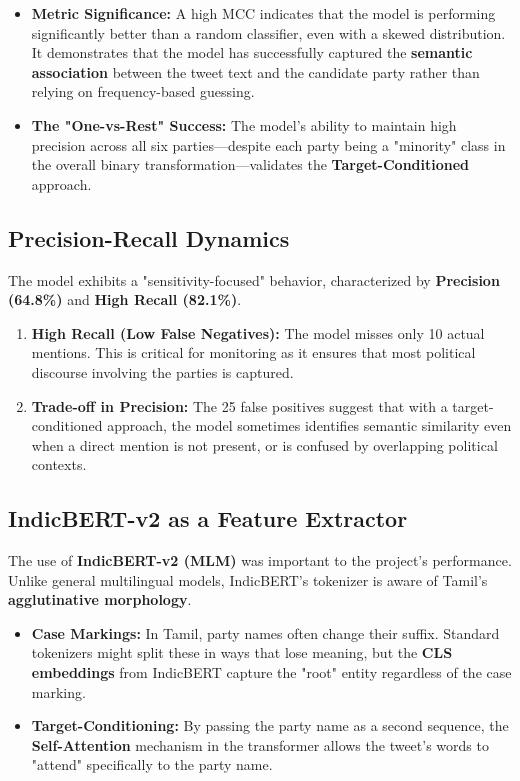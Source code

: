 \documentclass[12pt,a4paper]{article}
\begin{document}
\begin{itemize}
    \item \textbf{Metric Significance:} A high MCC indicates that the model is performing significantly better than a random classifier, even with a skewed distribution. It demonstrates that the model has successfully captured the \textbf{semantic association} between the tweet text and the candidate party rather than relying on frequency-based guessing.
    \item \textbf{The "One-vs-Rest" Success:} The model's ability to maintain high precision across all six parties—despite each party being a "minority" class in the overall binary transformation—validates the \textbf{Target-Conditioned} approach.
\end{itemize}

\subsection{Precision-Recall Dynamics}
The model exhibits a "sensitivity-focused" behavior, characterized by \textbf{Precision (64.8\%)} and \textbf{High Recall (82.1\%)}.

\begin{enumerate}
    \item \textbf{High Recall (Low False Negatives):} The model misses only 10 actual mentions. This is critical for monitoring as it ensures that most political discourse involving the parties is captured.
    \item \textbf{Trade-off in Precision:} The 25 false positives suggest that with a target-conditioned approach, the model sometimes identifies semantic similarity even when a direct mention is not present, or is confused by overlapping political contexts.
\end{enumerate}



\subsection{IndicBERT-v2 as a Feature Extractor}
The use of \textbf{IndicBERT-v2 (MLM)} was important to the project's performance. Unlike general multilingual models, IndicBERT's tokenizer is aware of Tamil's \textbf{agglutinative morphology}. 

\begin{itemize}
    \item \textbf{Case Markings:} In Tamil, party names often change their suffix. Standard tokenizers might split these in ways that lose meaning, but the \textbf{CLS embeddings} from IndicBERT capture the "root" entity regardless of the case marking.
    \item \textbf{Target-Conditioning:} By passing the party name as a second sequence, the \textbf{Self-Attention} mechanism in the transformer allows the tweet's words to "attend" specifically to the party name.
\end{itemize}
\end{document}
